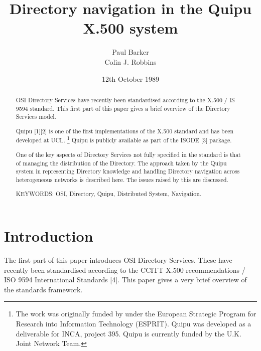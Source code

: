 

%
%

\title{Directory navigation in the Quipu X.500 system}
\author{Paul Barker\\
Colin J. Robbins}
\date{12th October 1989}

\maketitle

\begin{abstract}
OSI Directory Services have recently been standardised according to the
X.500 / IS 9594 standard.  This first part of this paper gives a 
brief overview of the Directory Services model.

Quipu [1][2] is one of the first implementations of the X.500 standard and
has been developed at UCL. 
\footnote{
 The work was originally funded by under the European Strategic 
Program for Research
into Information Technology (ESPRIT). Quipu was developed as a deliverable
for INCA, project 395.  Quipu is currently funded by the U.K. Joint Network
Team.
}
Quipu is
publicly available as part of the ISODE [3] package.

One of the key aspects of Directory Services not fully specified
in the standard is that of managing the distribution of the Directory. The
approach taken by the Quipu system in representing Directory knowledge and
handling Directory navigation across heterogeneous networks is described
here.  The issues raised by this are discussed.

KEYWORDS: OSI, Directory, Quipu, Distributed System, Navigation.
\end{abstract}

\section{Introduction}

The first part of this paper introduces 
OSI Directory Services. These have recently been standardised according to 
the CCITT
X.500 recommendations / ISO 9594 International Standards [4].  This paper
gives a very brief overview of the standards framework.

